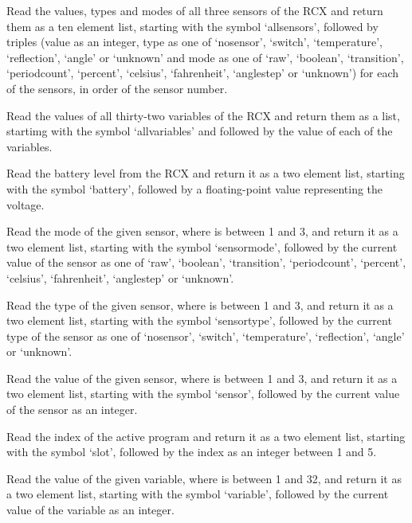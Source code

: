   Read the values, types and modes of all three sensors of the RCX and return them as a ten element list, starting with the
  symbol `allsensors', followed by triples (value as an integer, type as one of `nosensor', `switch', `temperature', `reflection',
  `angle' or `unknown' and mode as one of `raw', `boolean', `transition', `periodcount', `percent', `celsius', `fahrenheit',
  `anglestep' or `unknown') for each of the sensors, in order of the sensor number.
  
  Read the values of all thirty-two variables of the RCX and return them as a list, startimg with the
  symbol `allvariables' and followed by the value of each of the variables.
  
  Read the battery level from the RCX and return it as a two element list, starting with the symbol `battery', followed
  by a floating-point value representing the voltage.
  
  Read the mode of the given sensor, where  is between 1 and 3, and return it as a two element list,
  starting with the symbol `sensormode', followed by the current value of the sensor as one of `raw', `boolean', `transition', `periodcount', `percent', `celsius', `fahrenheit',
  `anglestep' or `unknown'.
  
  Read the type of the given sensor, where  is between 1 and 3, and return it as a two element list,
  starting with the symbol `sensortype', followed by the current type of the sensor as one of `nosensor', `switch', `temperature',
  `reflection', `angle' or `unknown'.
  
  Read the value of the given sensor, where  is between 1 and 3, and return it as a two element list,
  starting with the symbol `sensor', followed by the current value of the sensor as an integer.
  
  Read the index of the active program and return it as a two element list, starting with the symbol `slot', followed
  by the index as an integer between 1 and 5.
  
  Read the value of the given variable, where  is between 1 and 32, and return it as a two element list,
  starting with the symbol `variable', followed by the current value of the variable as an integer.
  
